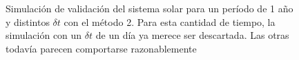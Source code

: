 \begin{figure}
{	\label{fig:ej2_m2_365_12}
	}
	\caption{
		Simulación de validación del sistema solar para un período de 1 año y distintos $\delta t$
		con el método 2.
		Para esta cantidad de tiempo, la simulación con un $\delta t$ de un día ya merece ser descartada.
		Las otras todavía parecen comportarse razonablemente
	}
	\label{ fig:res_ej2_m2_365 }
\end{figure}
